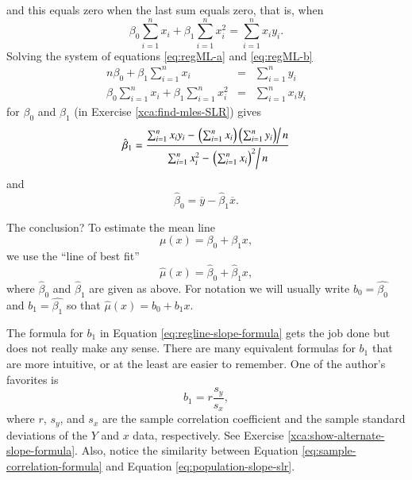 \documentclass[captions=tableheading]{scrbook}
\begin{document}
and this equals zero when the last sum equals zero, that is, when
\begin{equation}
\beta_{0} \sum_{i = 1}^{n}x_{i} + \beta_{1} \sum_{i = 1}^{n}x_{i}^{2} = \sum_{i = 1}^{n}x_{i}y_{i}.\label{eq:regML-b}
\end{equation}
Solving the system of equations \ref{eq:regML-a} and \ref{eq:regML-b}
\begin{eqnarray}
n\beta_{0} + \beta_{1}\sum_{i = 1}^{n}x_{i} & = & \sum_{i = 1}^{n}y_{i}\\
\beta_{0}\sum_{i = 1}^{n}x_{i}+\beta_{1}\sum_{i = 1}^{n}x_{i}^{2} & = & \sum_{i = 1}^{n}x_{i}y_{i}
\end{eqnarray}
for \( \beta_{0} \) and \( \beta_{1} \) (in Exercise \ref{xca:find-mles-SLR}) gives
\begin{equation}
\hat{\beta}_{1} = \frac{\sum_{i = 1}^{n}x_{i}y_{i} - \left.\left(\sum_{i = 1}^{n}x_{i}\right)\left(\sum_{i = 1}^{n}y_{i}\right)\right\slash n}{\sum_{i = 1}^{n}x_{i}^{2} - \left.\left(\sum_{i = 1}^{n}x_{i}\right)^{2}\right\slash n}\label{eq:regline-slope-formula}
\end{equation}
and
\begin{equation}
\hat{\beta}_{0} = \overline{y} - \hat{\beta}_{1}\overline{x}.
\end{equation}

The conclusion? To estimate the mean line 
\begin{equation}
\mu(x) = \beta_{0} + \beta_{1}x,
\end{equation}
we use the ``line of best fit''
\begin{equation}
\hat{\mu}(x) = \hat{\beta}_{0} + \hat{\beta}_{1}x,
\end{equation}
where \(\hat{\beta}_{0}\) and \(\hat{\beta}_{1}\) are given as above. For notation we will usually write \( b_{0} = \hat{\beta_{0}} \) and \( b_{1}=\hat{\beta_{1}} \) so that \( \hat{\mu}(x) = b_{0} + b_{1}x \).

\begin{rem}
The formula for \( b_{1} \) in Equation \ref{eq:regline-slope-formula} gets the job done but does not really make any sense. There are many equivalent formulas for \( b_{1} \) that are more intuitive, or at the least are easier to remember. One of the author's favorites is
\begin{equation}
b_{1} = r\frac{s_{y}}{s_{x}},\label{eq:sample-correlation-formula}
\end{equation}
where \(r\), \( s_{y} \), and \( s_{x} \) are the sample correlation coefficient and the sample standard deviations of the \(Y\) and \(x\) data, respectively. See Exercise \ref{xca:show-alternate-slope-formula}. Also, notice the similarity between Equation \ref{eq:sample-correlation-formula} and Equation \ref{eq:population-slope-slr}.
\end{rem}
\end{document}
